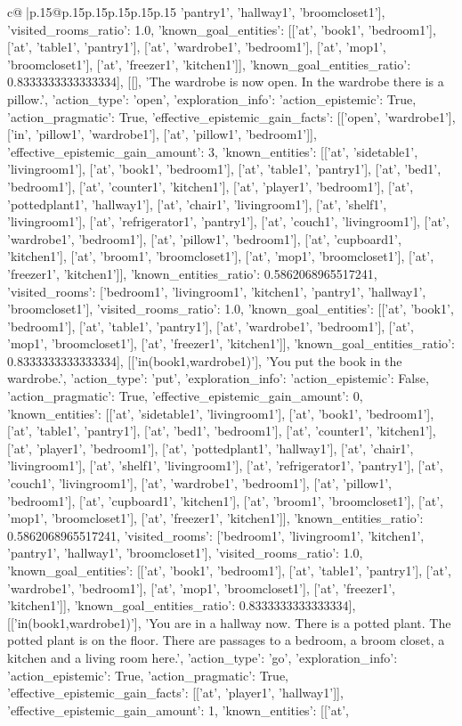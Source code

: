 \documentclass{article}
\begin{document}
{\begin{supertabular}{c@{$\;$}|p{.15\linewidth}@{}p{.15\linewidth}p{.15\linewidth}p{.15\linewidth}p{.15\linewidth}p{.15\linewidth}}
{{{'pantry1', 'hallway1', 'broomcloset1'], 'visited_rooms_ratio': 1.0, 'known_goal_entities': [['at', 'book1', 'bedroom1'], ['at', 'table1', 'pantry1'], ['at', 'wardrobe1', 'bedroom1'], ['at', 'mop1', 'broomcloset1'], ['at', 'freezer1', 'kitchen1']], 'known_goal_entities_ratio': 0.8333333333333334}}], [[], 'The wardrobe is now open. In the wardrobe there is a pillow.', {'action_type': 'open', 'exploration_info': {'action_epistemic': True, 'action_pragmatic': True, 'effective_epistemic_gain_facts': [['open', 'wardrobe1'], ['in', 'pillow1', 'wardrobe1'], ['at', 'pillow1', 'bedroom1']], 'effective_epistemic_gain_amount': 3, 'known_entities': [['at', 'sidetable1', 'livingroom1'], ['at', 'book1', 'bedroom1'], ['at', 'table1', 'pantry1'], ['at', 'bed1', 'bedroom1'], ['at', 'counter1', 'kitchen1'], ['at', 'player1', 'bedroom1'], ['at', 'pottedplant1', 'hallway1'], ['at', 'chair1', 'livingroom1'], ['at', 'shelf1', 'livingroom1'], ['at', 'refrigerator1', 'pantry1'], ['at', 'couch1', 'livingroom1'], ['at', 'wardrobe1', 'bedroom1'], ['at', 'pillow1', 'bedroom1'], ['at', 'cupboard1', 'kitchen1'], ['at', 'broom1', 'broomcloset1'], ['at', 'mop1', 'broomcloset1'], ['at', 'freezer1', 'kitchen1']], 'known_entities_ratio': 0.5862068965517241, 'visited_rooms': ['bedroom1', 'livingroom1', 'kitchen1', 'pantry1', 'hallway1', 'broomcloset1'], 'visited_rooms_ratio': 1.0, 'known_goal_entities': [['at', 'book1', 'bedroom1'], ['at', 'table1', 'pantry1'], ['at', 'wardrobe1', 'bedroom1'], ['at', 'mop1', 'broomcloset1'], ['at', 'freezer1', 'kitchen1']], 'known_goal_entities_ratio': 0.8333333333333334}}], [['in(book1,wardrobe1)'], 'You put the book in the wardrobe.', {'action_type': 'put', 'exploration_info': {'action_epistemic': False, 'action_pragmatic': True, 'effective_epistemic_gain_amount': 0, 'known_entities': [['at', 'sidetable1', 'livingroom1'], ['at', 'book1', 'bedroom1'], ['at', 'table1', 'pantry1'], ['at', 'bed1', 'bedroom1'], ['at', 'counter1', 'kitchen1'], ['at', 'player1', 'bedroom1'], ['at', 'pottedplant1', 'hallway1'], ['at', 'chair1', 'livingroom1'], ['at', 'shelf1', 'livingroom1'], ['at', 'refrigerator1', 'pantry1'], ['at', 'couch1', 'livingroom1'], ['at', 'wardrobe1', 'bedroom1'], ['at', 'pillow1', 'bedroom1'], ['at', 'cupboard1', 'kitchen1'], ['at', 'broom1', 'broomcloset1'], ['at', 'mop1', 'broomcloset1'], ['at', 'freezer1', 'kitchen1']], 'known_entities_ratio': 0.5862068965517241, 'visited_rooms': ['bedroom1', 'livingroom1', 'kitchen1', 'pantry1', 'hallway1', 'broomcloset1'], 'visited_rooms_ratio': 1.0, 'known_goal_entities': [['at', 'book1', 'bedroom1'], ['at', 'table1', 'pantry1'], ['at', 'wardrobe1', 'bedroom1'], ['at', 'mop1', 'broomcloset1'], ['at', 'freezer1', 'kitchen1']], 'known_goal_entities_ratio': 0.8333333333333334}}], [['in(book1,wardrobe1)'], 'You are in a hallway now. There is a potted plant. The potted plant is on the floor. There are passages to a bedroom, a broom closet, a kitchen and a living room here.', {'action_type': 'go', 'exploration_info': {'action_epistemic': True, 'action_pragmatic': True, 'effective_epistemic_gain_facts': [['at', 'player1', 'hallway1']], 'effective_epistemic_gain_amount': 1, 'known_entities': [['at', }}}
\end{supertabular}}
\end{document}
